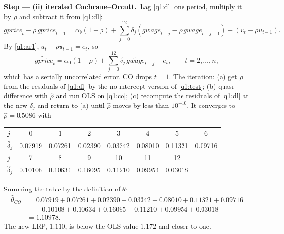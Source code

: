 \documentclass[11pt,a4paper]{article}
\numberwithin{equation}{questao}
\newcommand{\passo}[2]{\par\smallskip\noindent\textbf{Step --- #1.}~#2}
\newcommand{\var}[1]{\mathit{#1}}
\begin{document}
\begin{sol}
\passo{(ii) iterated Cochrane--Orcutt}{Lag \eqref{q1:dl} one period, multiply it by $\rho$ and subtract it from \eqref{q1:dl}:
\begin{equation*}
\var{gprice}_t-\rho\,\var{gprice}_{t-1}=\alpha_0(1-\rho)+\sum_{j=0}^{12}\delta_j\left(\var{gwage}_{t-j}-\rho\,\var{gwage}_{t-j-1}\right)+\left(u_t-\rho u_{t-1}\right).
\end{equation*}
By \eqref{q1:ar1}, $u_t-\rho u_{t-1}=e_t$, so
\begin{equation}
\widetilde{\var{gprice}}_t=\alpha_0(1-\rho)+\sum_{j=0}^{12}\delta_j\,\widetilde{\var{gwage}}_{t-j}+e_t,\qquad t=2,\dots,n, \label{q1:co}
\end{equation}
which has a serially uncorrelated error. CO drops $t=1$. The iteration: (a) get $\hat\rho$ from the
residuals of \eqref{q1:dl} by the no-intercept version of \eqref{q1:test}; (b) quasi-difference with
$\hat\rho$ and run OLS on \eqref{q1:co}; (c) recompute the residuals of \eqref{q1:dl} at the new
$\hat\delta_j$ and return to (a) until $\hat\rho$ moves by less than $10^{-10}$. It converges to
$\hat\rho=0.5086$ with
\begin{center}\small
\begin{tabular}{lccccccc}
\toprule
$j$ & 0 & 1 & 2 & 3 & 4 & 5 & 6\\
$\hat\delta_j$ & 0.07919 & 0.07261 & 0.02390 & 0.03342 & 0.08010 & 0.11321 & 0.09716\\
\midrule
$j$ & 7 & 8 & 9 & 10 & 11 & 12 & \\
$\hat\delta_j$ & 0.10108 & 0.10634 & 0.16095 & 0.11210 & 0.09954 & 0.03018 & \\
\bottomrule
\end{tabular}
\end{center}
Summing the table by the definition of $\theta$:
\begin{align*}
\hat\theta_{CO} &= 0.07919+0.07261+0.02390+0.03342+0.08010+0.11321+0.09716\\
&\quad+0.10108+0.10634+0.16095+0.11210+0.09954+0.03018\\
&= 1.10978.
\end{align*}
The new LRP, $1.110$, is below the OLS value $1.172$ and closer to one.}


\end{sol}
\end{document}
